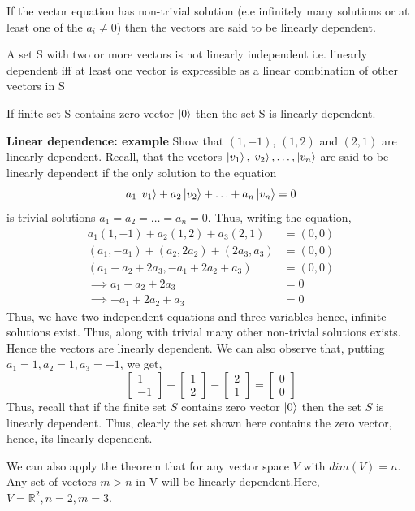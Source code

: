 If the vector equation has non-trivial solution (e.e infinitely many solutions or at least one of the $a_i \neq 0$) then the vectors are said to be linearly dependent.

\begin{corollary}
    A set S with two or more vectors is not linearly independent i.e. linearly dependent iff at least one vector is expressible as a linear combination of other vectors in S
\end{corollary}

\begin{corollary}
    If finite set S contains zero vector $\ket{0}$ then the set S is linearly dependent.
\end{corollary}

\begin{example}
    \textbf{Linear dependence: example} Show that $(1,-1)$, $(1,2)$ and $(2,1)$ are linearly dependent.
    Recall, that the vectors $\ket{v_1},\ket{v_2}, \ldots, \ket{v_n}$ are said to be linearly dependent if the only solution to the equation
    \[
    a_1\ket{v_1}+a_2\ket{v_2}+\ldots +a_n\ket{v_n}=0
    \]
    is trivial solutions $a_1=a_2=\ldots=a_n=0$.
    Thus, writing the equation,
    \begin{align*}
    a_1(1,-1)+a_2(1,2)+a_3(2,1)&=(0,0)\\
    (a_1,-a_1)+(a_2,2a_2)+(2a_3,a_3)&=(0,0)\\
    (a_1+a_2+2a_3,-a_1+2a_2+a_3)&=(0,0)\\
    \implies a_1+a_2+2a_3&=0\\
    \implies -a_1+2a_2+a_3&=0
    \end{align*}
    Thus, we have two independent equations and three variables hence, infinite solutions exist. Thus, along with trivial many other non-trivial solutions exists. Hence the vectors are linearly dependent.
    We can also observe that, putting $a_1=1,a_2=1,a_3=-1$, we get,
    \[
    \begin{bmatrix} 1 \\ -1 \end{bmatrix}+ \begin{bmatrix} 1 \\ 2 \end{bmatrix}
    -\begin{bmatrix} 2 \\ 1 \end{bmatrix}=
    \begin{bmatrix} 0 \\ 0 \end{bmatrix}
    \]
    Thus, recall that if the finite set $S$ contains zero vector $\ket{0}$ then the set $S$ is linearly dependent. Thus, clearly the set shown here contains the zero vector, hence, its linearly dependent.

    We can also apply the theorem that for any vector space $V$ with $dim(V)=n$. Any set of vectors $m>n$ in V will be linearly dependent.Here, $V=\mathbb{R}^2, n=2,m=3$.
\end{example}


